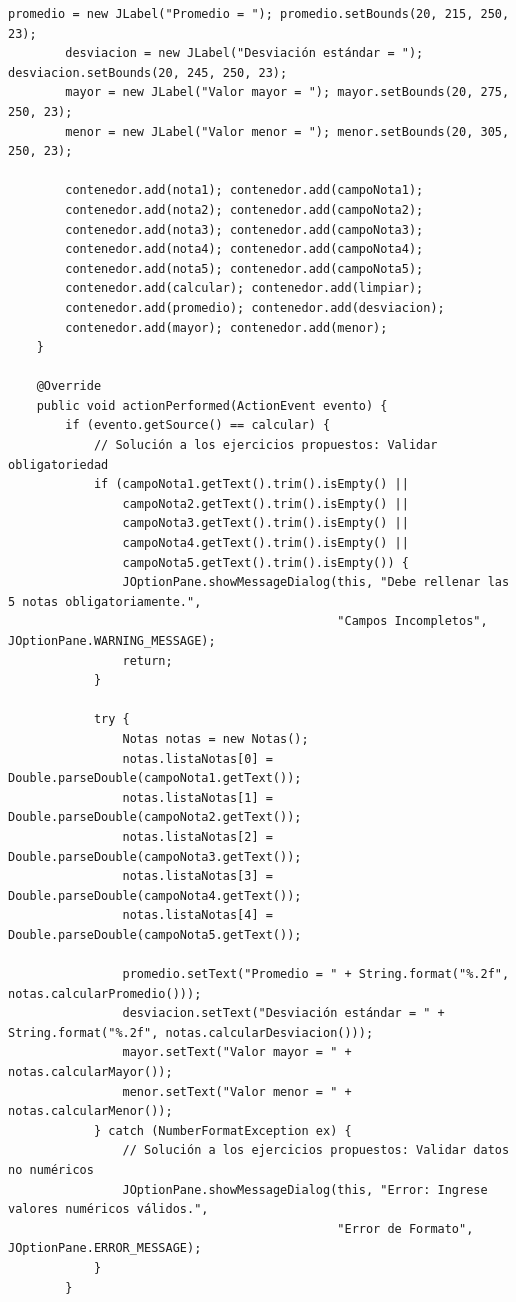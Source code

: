 \documentclass[12pt,a4paper]{article}
\begin{document}
\begin{lstlisting}[caption={Clase VentanaPrincipal.java}]
        promedio = new JLabel("Promedio = "); promedio.setBounds(20, 215, 250, 23);
        desviacion = new JLabel("Desviación estándar = "); desviacion.setBounds(20, 245, 250, 23);
        mayor = new JLabel("Valor mayor = "); mayor.setBounds(20, 275, 250, 23);
        menor = new JLabel("Valor menor = "); menor.setBounds(20, 305, 250, 23);

        contenedor.add(nota1); contenedor.add(campoNota1);
        contenedor.add(nota2); contenedor.add(campoNota2);
        contenedor.add(nota3); contenedor.add(campoNota3);
        contenedor.add(nota4); contenedor.add(campoNota4);
        contenedor.add(nota5); contenedor.add(campoNota5);
        contenedor.add(calcular); contenedor.add(limpiar);
        contenedor.add(promedio); contenedor.add(desviacion);
        contenedor.add(mayor); contenedor.add(menor);
    }

    @Override
    public void actionPerformed(ActionEvent evento) {
        if (evento.getSource() == calcular) {
            // Solución a los ejercicios propuestos: Validar obligatoriedad
            if (campoNota1.getText().trim().isEmpty() ||
                campoNota2.getText().trim().isEmpty() ||
                campoNota3.getText().trim().isEmpty() ||
                campoNota4.getText().trim().isEmpty() ||
                campoNota5.getText().trim().isEmpty()) {
                JOptionPane.showMessageDialog(this, "Debe rellenar las 5 notas obligatoriamente.",
                                              "Campos Incompletos", JOptionPane.WARNING_MESSAGE);
                return;
            }

            try {
                Notas notas = new Notas();
                notas.listaNotas[0] = Double.parseDouble(campoNota1.getText());
                notas.listaNotas[1] = Double.parseDouble(campoNota2.getText());
                notas.listaNotas[2] = Double.parseDouble(campoNota3.getText());
                notas.listaNotas[3] = Double.parseDouble(campoNota4.getText());
                notas.listaNotas[4] = Double.parseDouble(campoNota5.getText());

                promedio.setText("Promedio = " + String.format("%.2f", notas.calcularPromedio()));
                desviacion.setText("Desviación estándar = " + String.format("%.2f", notas.calcularDesviacion()));
                mayor.setText("Valor mayor = " + notas.calcularMayor());
                menor.setText("Valor menor = " + notas.calcularMenor());
            } catch (NumberFormatException ex) {
                // Solución a los ejercicios propuestos: Validar datos no numéricos
                JOptionPane.showMessageDialog(this, "Error: Ingrese valores numéricos válidos.",
                                              "Error de Formato", JOptionPane.ERROR_MESSAGE);
            }
        }


\end{lstlisting}
\end{document}
